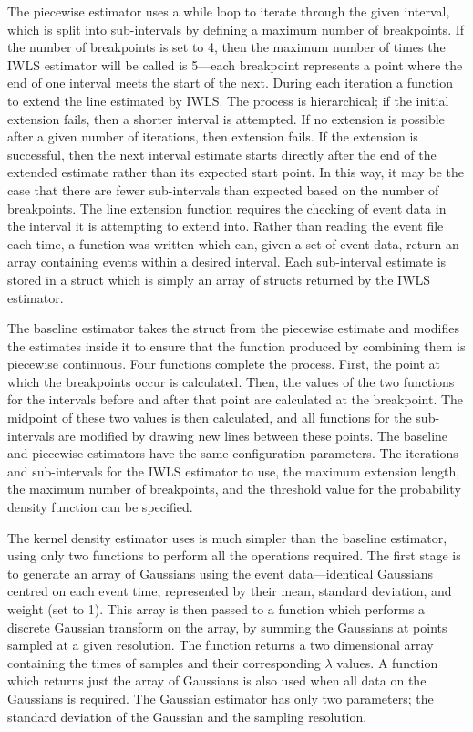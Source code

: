 \documentclass[a4paper,11pt]{article}
\begin{document}
   The piecewise estimator uses a while loop to iterate through the given
   interval, which is split into sub-intervals by defining a maximum number of
   breakpoints. If the number of breakpoints is set to 4, then the maximum
   number of times the IWLS estimator will be called is 5---each breakpoint
   represents a point where the end of one interval meets the start of the
   next. During each iteration a function to extend the line estimated by
   IWLS. The process is hierarchical; if the initial extension fails, then a
   shorter interval is attempted. If no extension is possible after a given
   number of iterations, then extension fails. If the extension is successful,
   then the next interval estimate starts directly after the end of the extended
   estimate rather than its expected start point. In this way, it may be the
   case that there are fewer sub-intervals than expected based on the number of
   breakpoints. The line extension function requires the checking of event data
   in the interval it is attempting to extend into. Rather than reading the
   event file each time, a function was written which can, given a set of event
   data, return an array containing events within a desired interval. Each
   sub-interval estimate is stored in a struct which is simply an array of
   structs returned by the IWLS estimator.

   The baseline estimator takes the struct from the piecewise estimate and
   modifies the estimates inside it to ensure that the function produced by
   combining them is piecewise continuous. Four functions complete the
   process. First, the point at which the breakpoints occur is calculated. Then,
   the values of the two functions for the intervals before and after that point
   are calculated at the breakpoint. The midpoint of these two values is then
   calculated, and all functions for the sub-intervals are modified by drawing
   new lines between these points. The baseline and piecewise estimators have
   the same configuration parameters. The iterations and sub-intervals for the
   IWLS estimator to use, the maximum extension length, the maximum number of
   breakpoints, and the threshold value for the probability density function can
   be specified.

   The kernel density estimator uses is much simpler than the baseline
   estimator, using only two functions to perform all the operations
   required. The first stage is to generate an array of Gaussians using the
   event data---identical Gaussians centred on each event time, represented by
   their mean, standard deviation, and weight (set to 1). This array is then
   passed to a function which performs a discrete Gaussian transform on the
   array, by summing the Gaussians at points sampled at a given resolution. The
   function returns a two dimensional array containing the times of samples and
   their corresponding $\lambda$ values. A function which returns just the array
   of Gaussians is also used when all data on the Gaussians is required. The
   Gaussian estimator has only two parameters; the standard deviation of the
   Gaussian and the sampling resolution.
\end{document}
